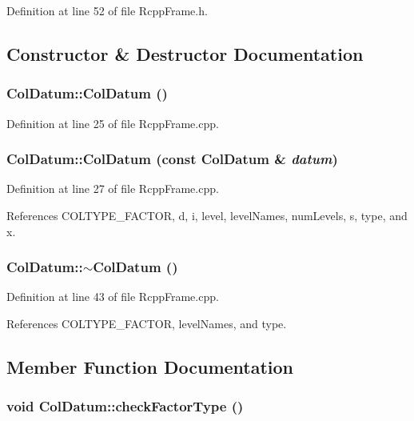 Definition at line 52 of file RcppFrame.h.

\subsection{Constructor \& Destructor Documentation}
\hypertarget{classColDatum_ab0aa09b7e8d9acd2b0435b256c6b4da7}{
\subsubsection[{ColDatum}]{\setlength{\rightskip}{0pt plus 5cm}ColDatum::ColDatum ()}}
\label{classColDatum_ab0aa09b7e8d9acd2b0435b256c6b4da7}


Definition at line 25 of file RcppFrame.cpp.\hypertarget{classColDatum_a0507c6e2b4c76ee5364af001855fbe4e}{
\subsubsection[{ColDatum}]{\setlength{\rightskip}{0pt plus 5cm}ColDatum::ColDatum (const {\bf ColDatum} \& {\em datum})}}
\label{classColDatum_a0507c6e2b4c76ee5364af001855fbe4e}


Definition at line 27 of file RcppFrame.cpp.

References COLTYPE\_\-FACTOR, d, i, level, levelNames, numLevels, s, type, and x.\hypertarget{classColDatum_accc1e3ec9da32643bd4953f983165b64}{
\subsubsection[{$\sim$ColDatum}]{\setlength{\rightskip}{0pt plus 5cm}ColDatum::$\sim$ColDatum ()}}
\label{classColDatum_accc1e3ec9da32643bd4953f983165b64}


Definition at line 43 of file RcppFrame.cpp.

References COLTYPE\_\-FACTOR, levelNames, and type.

\subsection{Member Function Documentation}
\hypertarget{classColDatum_a9d151a64fb91608752346a9a16551410}{
\subsubsection[{checkFactorType}]{\setlength{\rightskip}{0pt plus 5cm}void ColDatum::checkFactorType ()}}
\label{classColDatum_a9d151a64fb91608752346a9a16551410}



